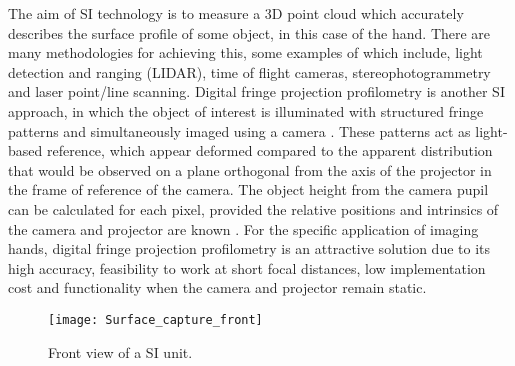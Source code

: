 \documentclass[twoside]{bhamthesis}
\theoremstyle{definition}
\begin{document}
The aim of SI technology is to measure a 3D point cloud which accurately describes the surface profile of some object, in this case of the hand. There are many methodologies for achieving this, some examples of which include, light detection and ranging (LIDAR), time of flight cameras, stereophotogrammetry and laser point/line scanning. Digital fringe projection profilometry is another SI approach, in which the object of interest is illuminated with structured fringe patterns and simultaneously imaged using a camera \cite{geng2011structured}. These patterns act as light-based reference, which appear deformed compared to the apparent distribution that would be observed on a plane orthogonal from the axis of the projector in the frame of reference of the camera. The object height from the camera pupil can be calculated for each pixel, provided the relative positions and intrinsics of the camera and projector are known \cite{srinivasan1984automated}. For the specific application of imaging hands, digital fringe projection profilometry is an attractive solution due to its high accuracy, feasibility to work at short focal distances, low implementation cost and functionality when the camera and projector remain static.


\begin{figure}[!ht]
\centering
  \texttt{[image: Surface\_capture\_front]}
\caption{Front view of a SI unit.}
  \label{fig:surface_capture_front}

\end{figure} 
\end{document}
